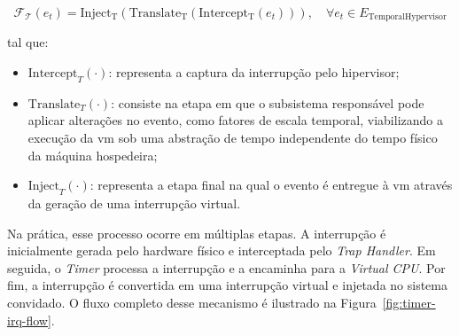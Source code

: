 \begin{equation}
\mathcal{F_T}(e_t) = \mathrm{Inject_{T}}(\mathrm{Translate_{T}}(\mathrm{Intercept_{T}}(e_{t}))), \quad \forall e_t \in E_{\mathrm{TemporalHypervisor}}
\end{equation}

tal que:

\begin{itemize}
    \item $\mathrm{Intercept}_T(\cdot)$: representa a captura da interrupção pelo hipervisor;
	\item $\mathrm{Translate}_T(\cdot)$: consiste na etapa em que o subsistema responsável pode aplicar alterações no evento, como fatores de escala temporal,
	viabilizando a execução da \gls{vm} sob uma abstração de tempo independente do tempo físico da máquina hospedeira;
    \item $\mathrm{Inject}_T(\cdot)$: representa a etapa final na qual o evento é entregue à \gls{vm} através da geração de uma interrupção virtual.
\end{itemize}

Na prática, esse processo ocorre em múltiplas etapas. A interrupção é inicialmente gerada pelo hardware físico
e interceptada pelo \textit{Trap Handler}. Em seguida, o \textit{Timer} processa a interrupção e a encaminha para a \textit{Virtual CPU}. Por fim, a interrupção é convertida em uma
interrupção virtual e injetada no sistema convidado. O fluxo completo desse mecanismo é ilustrado na Figura~\ref{fig:timer-irq-flow}.

\vspace{0.4cm}

 \begin{center}
\end{center}



